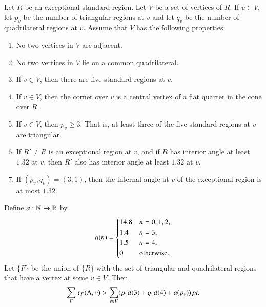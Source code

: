 \begin{lemma}\label{lemma:excess-1}
Let $R$ be an exceptional standard region.  Let $V$
be a set of vertices of $R$.  If $v\in V$, let $p_v$ be the number
of triangular regions at $v$ and let $q_v$ be the number of
quadrilateral regions at $v$.  Assume that $V$ has the following
properties:
    \begin{enumerate}
        \item No two
        vertices in $V$ are adjacent.
        \item No two vertices
        in $V$ lie on a common quadrilateral.
        \item If $v\in V$, then there are five standard regions at
        $v$.
        \item If $v\in V$, then the corner over $v$ is a central
        vertex of a flat quarter in the cone over $R$.
        \item If $v\in V$, then $p_v\ge 3$.  That is, at least
        three of the five standard regions at $v$ are triangular.
        \item If $R'\ne R$ is an exceptional region at $v$, and if $R$
        has interior angle at least $1.32$ at $v$, then $R'$ also has interior
        angle at least $1.32$ at $v$.
        \item If $(p_v,q_v)=(3,1)$, then the internal angle at $v$ of the exceptional
        region is at most $1.32$.
    \end{enumerate}
  Define $a:{\mathbb N}\to {\mathbb R}$ by
  $$a(n) = \begin{cases}
    14.8 &n=0,1,2,\\
    1.4 & n=3,\\
    1.5 & n=4,\\
    0 & \text{otherwise.}
  \end{cases}
  \index{aZ@$a(n)$}
  $$
Let $\{F\}$ be the union of $\{R\}$ with the set of triangular and
quadrilateral regions that have a vertex at some $v\in V$. Then
    $$\sum_F\tau_F(\Lambda,v) > \sum_{v\in V} (p_v d(3) + q_v d(4) + a
    (p_v))\,\hbox{\it pt}.$$
\end{lemma}

